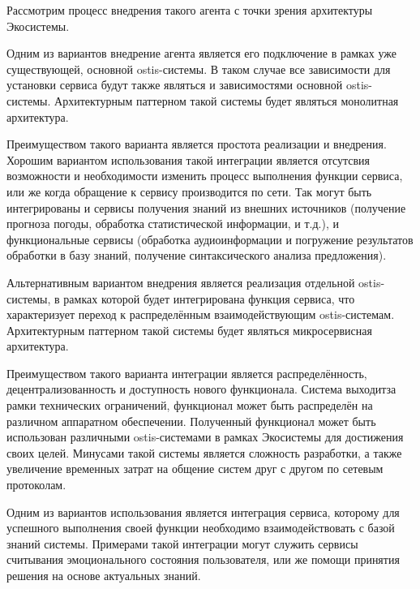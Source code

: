 Рассмотрим процесс внедрения такого агента с точки зрения архитектуры Экосистемы. 

Одним из вариантов внедрение агента является его подключение в рамках уже существующей, основной ostis-системы. В таком случае все зависимости для установки сервиса будут также являться и зависимостями основной ostis-системы. Архитектурным паттерном такой системы будет являться монолитная архитектура. 

Преимуществом такого варианта является простота реализации и внедрения. Хорошим вариантом использования такой интеграции является отсутсвия возможности и необходимости изменить процесс выполнения функции сервиса, или же когда обращение к сервису производится по сети. Так могут быть интегрированы и сервисы получения знаний из внешних источников (получение прогноза погоды, обработка статистической информации, и т.д.), и функциональные сервисы (обработка аудиоинформации и погружение результатов обработки в базу знаний, получение синтаксического анализа предложения). 

Альтернативным вариантом внедрения является реализация отдельной ostis-системы, в рамках которой будет интегрирована функция сервиса, что характеризует переход к распределённым взаимодействующим ostis-системам. Архитектурным паттерном такой системы будет являться микросервисная архитектура.

Преимуществом такого варианта интеграции является распределённость, децентрализованность и доступность нового функционала. Система выходитза рамки технических ограничений, функционал может быть распределён на различном аппаратном обеспечении. Полученный функционал может быть использован различными ostis-системами в рамках Экосистемы для достижения своих целей. Минусами такой системы является сложность разработки, а также увеличение временных затрат на общение систем друг с другом по сетевым протоколам. 

Одним из вариантов использования является интеграция сервиса, которому для успешного выполнения своей функции необходимо взаимодействовать с базой знаний системы. Примерами такой интеграции могут служить сервисы считывания эмоционального состояния пользователя, или же помощи принятия решения на основе актуальных знаний.
